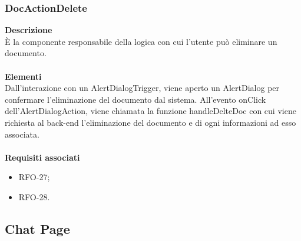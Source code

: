 \subsubsection{DocActionDelete}
\textbf{Descrizione}\\
È la componente responsabile della logica con cui l'utente può eliminare un documento.\\ \\
\textbf{Elementi}\\
Dall'interazione con un AlertDialogTrigger, viene aperto un AlertDialog per confermare l'eliminazione del documento dal sistema. All'evento onClick dell'AlertDialogAction, viene chiamata la funzione handleDelteDoc con cui viene richiesta al back-end l'eliminazione del documento e di ogni informazioni ad esso associata.\\ \\
\textbf{Requisiti associati}
\begin{itemize}
    \item RFO-27;
    \item RFO-28.
\end{itemize}



\newpage

\subsection{Chat Page}

\newpage
